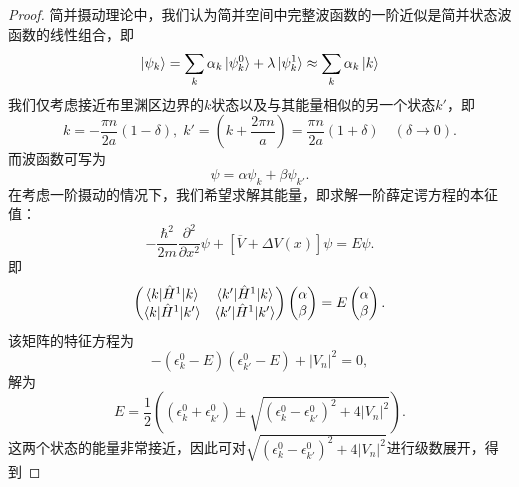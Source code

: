 \begin{proof}
    简并摄动理论中，我们认为简并空间中完整波函数的一阶近似是简并状态波函数的线性组合，即
    \begin{equation}
        \ket{\psi_k} = \sum_{k} \alpha_k \ket{\psi_k^0} + \lambda \ket{\psi_k^1} \approx \sum_k \alpha_k \ket{k}
    \end{equation}
    我们仅考虑接近布里渊区边界的$k$状态以及与其能量相似的另一个状态$k'$，即
    \begin{equation}
        k = - \frac{\pi n}{2 a} (1 - \delta), \; k' = (k + \frac{2\pi n}{a}) = \frac{\pi n}{2a}(1 + \delta) \quad (\delta \to 0).
    \end{equation}
    而波函数可写为
    \begin{equation}
        \psi = \alpha \psi_k + \beta \psi_{k'}.
    \end{equation}
    在考虑一阶摄动的情况下，我们希望求解其能量，即求解一阶薛定谔方程的本征值：
    \begin{equation}
        - \frac{\hbar^2}{2m} \frac{\partial^2}{\partial x^2} \psi + [\overline V + \Delta V(x)] \psi = E \psi.
    \end{equation}
    即
    \begin{equation}
        \begin{pmatrix}
            \braket{k|\hat H^1|k} & \braket{k'|\hat H^1|k} \\
            \braket{k|\hat H^1|k'} & \braket{k'|\hat H^1|k'} \\
        \end{pmatrix}
        \begin{pmatrix}
            \alpha \\ \beta
        \end{pmatrix} = E \begin{pmatrix}
            \alpha \\ \beta
        \end{pmatrix}.
    \end{equation}
    该矩阵的特征方程为
    \begin{equation}
        - (\epsilon_k^0 - E)(\epsilon_{k'}^0 - E) + |V_n|^2 = 0,
    \end{equation}
    解为
    \begin{equation}
        E = \frac{1}{2} \left( (\epsilon_k^0 + \epsilon_{k'}^0) \pm \sqrt{(\epsilon_{k}^0 - \epsilon_{k'}^0)^2 + 4 |V_n|^2} \right).
    \end{equation}
    这两个状态的能量非常接近，因此可对$\sqrt{(\epsilon_{k}^0 - \epsilon_{k'}^0)^2 + 4 |V_n|^2}$进行级数展开，得到

\end{proof}
